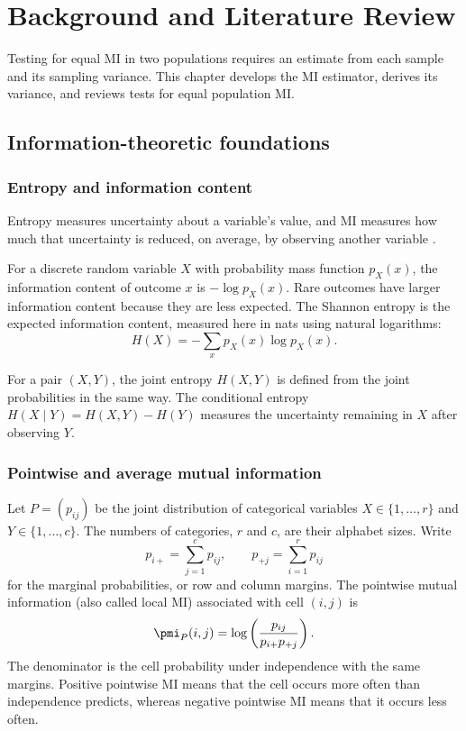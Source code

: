 \chapter{Background and Literature Review}
\label{chap:background}

Testing for equal MI in two populations requires an estimate from each
sample and its sampling variance. This chapter develops the MI estimator,
derives its variance, and reviews tests for equal population MI.

\section{Information-theoretic foundations}

\subsection{Entropy and information content}

Entropy measures uncertainty about a variable's value, and MI measures how
much that uncertainty is reduced, on average, by observing another variable
\citep{shannon1948}.

For a discrete random variable \(X\) with probability mass function
\(p_X(x)\), the information content of outcome \(x\) is
\(-\log p_X(x)\).
Rare outcomes have larger information content because they are less expected.
The Shannon entropy is the expected information content, measured here in
nats using natural logarithms:
\begin{equation}
  H(X)=-\sum_x p_X(x)\log p_X(x).
  \label{eq:entropy}
\end{equation}

For a pair \((X,Y)\), the joint entropy \(H(X,Y)\) is defined from the joint
probabilities in the same way. The conditional entropy
\(
H(X\mid Y)=H(X,Y)-H(Y)
\)
measures the uncertainty remaining in \(X\) after observing \(Y\).

\subsection{Pointwise and average mutual information}

Let \(P=(p_{ij})\) be the joint distribution of categorical variables
\(X\in\{1,\ldots,r\}\) and \(Y\in\{1,\ldots,c\}\).
The numbers of categories, \(r\) and \(c\), are their alphabet sizes. Write
\begin{equation}
  p_{i+}=\sum_{j=1}^{c}p_{ij},
  \qquad
  p_{+j}=\sum_{i=1}^{r}p_{ij}
\end{equation}
for the marginal probabilities, or row and column margins. The pointwise
mutual information (also called local MI) associated with cell \((i,j)\) is
\begin{equation}
  \pmi_P(i,j)
  =\log\left(\frac{p_{ij}}{p_{i+}p_{+j}}\right).
  \label{eq:background-pmi}
\end{equation}
The denominator is the cell probability under independence with the same
margins. Positive pointwise MI means that the cell occurs more often than
independence predicts, whereas negative pointwise MI means that it occurs
less often.

